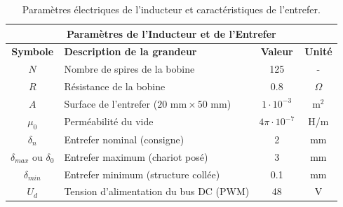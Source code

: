 \begin{table}[H]
    \centering
    \renewcommand{\arraystretch}{1.2}
    \begin{tabular}{|c|l|c|c|}
        \hline
        \multicolumn{4}{|c|}{\textbf{Paramètres de l'Inducteur et de l'Entrefer}}                                                           \\ \hline
        \textbf{Symbole}             & \textbf{Description de la grandeur}                          & \textbf{Valeur}      & \textbf{Unité} \\ \hline
        $N$                          & Nombre de spires de la bobine                                & 125                  & -              \\ \hline
        $R$                          & Résistance de la bobine                                      & 0.8                  & $\Omega$       \\ \hline
        $A$                          & Surface de l'entrefer ($20 \text{ mm} \times 50 \text{ mm}$) & $1 \cdot 10^{-3}$    & m$^2$          \\ \hline
        $\mu_0$                      & Perméabilité du vide                                         & $4\pi \cdot 10^{-7}$ & H/m            \\ \hline
        $\delta_n$                   & Entrefer nominal (consigne)                                  & 2                    & mm             \\ \hline
        $\delta_{max}$ ou $\delta_0$ & Entrefer maximum (chariot posé)                              & 3                    & mm             \\ \hline
        $\delta_{min}$               & Entrefer minimum (structure collée)                          & 0.1                  & mm             \\ \hline
        $U_{d}$                      & Tension d'alimentation du bus DC (PWM)                       & 48                   & V              \\ \hline
    \end{tabular}
    \caption{Paramètres électriques de l'inducteur et caractéristiques de l'entrefer.}
    \label{tab:param_inducteur_entrefer}
\end{table}


